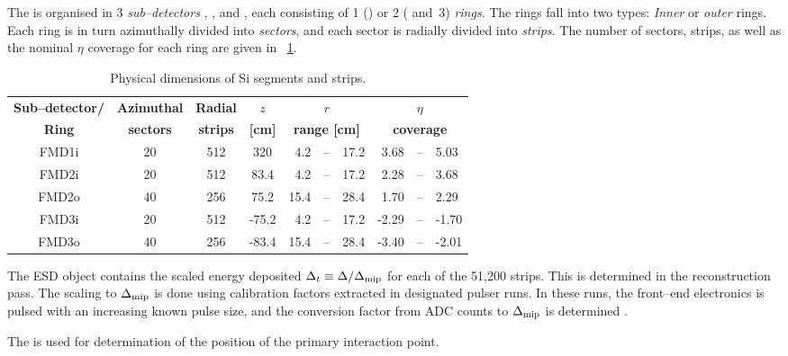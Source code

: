 \documentclass[compat,11pt]{alicenote}
\DeclareRobustCommand{\AlwaysText}[1]{\ifmmode\relax\text{#1}\else #1\fi}
\newcommand*\ESD{\AlwaysText{ESD}}
\newcommand{\DeltaMip}{\ensuremath\Delta_{\text{mip}}}
\newcommand\headColor{\rowcolor{alicered!25!white}}
\newcommand\altRowColor{\rowcolor{aliceyellow!25!white}}
\begin{document}
The \FMD{} is organised in 3 \emph{sub--detectors} , ,
and , each consisting of 1 () or 2 ( and~3)
\emph{rings}.  The rings fall into two types: \emph{Inner} or
\emph{outer} rings.  Each ring is in turn azimuthally divided into
\emph{sectors}, and each sector is radially divided into
\emph{strips}.  The number of sectors, strips, as well as the nominal
$\eta$ coverage for each ring are given in
\tablename~\ref{tab:fmd:overview}.

\begin{table}[htbp]
  \begin{center}
    \caption{Physical dimensions of Si segments and strips.}
    \label{tab:fmd:overview}
    \begin{tabular}{|c|cc|crcl|rcl|}
      \hline
      \headColor%
      \textbf{Sub--detector/} &
      \textbf{Azimuthal}&
      \textbf{Radial} &
      $z$ &
      \multicolumn{3}{c|}{\textbf{$r$}} &
      \multicolumn{3}{c|}{\textbf{$\eta$}} \\ 
      \rowcolor{alicered!25!white}
      \textbf{Ring}&  
      \textbf{sectors} &
      \textbf{strips} & 
      \textbf{[cm]} &
      \multicolumn{3}{c|}{\textbf{range [cm]}} &
      \multicolumn{3}{c|}{\textbf{coverage}} \\
      \hline
      FMD1i & 20& 512& 320  &  4.2&--&17.2& 3.68&--&5.03\\
      \altRowColor{}%
      FMD2i & 20& 512&  83.4&  4.2&--&17.2& 2.28&--&3.68\\
      FMD2o & 40& 256&  75.2& 15.4&--&28.4& 1.70&--&2.29\\
      \altRowColor{}%
      FMD3i & 20& 512& -75.2&  4.2&--&17.2&-2.29&--&-1.70\\
      FMD3o & 40& 256& -83.4& 15.4&--&28.4&-3.40&--&-2.01\\
      \hline
    \end{tabular}
  \end{center}
\end{table}

The \FMD{} \ESD{} object contains the scaled energy deposited
$\Delta_t\equiv\Delta /\DeltaMip$ for each of the 51,200 strips.  This
is determined in the reconstruction pass.  The scaling to $\DeltaMip$
is done using calibration factors extracted in designated pulser runs.
In these runs, the front--end electronics is pulsed with an increasing
known pulse size, and the conversion factor from ADC counts to
$\DeltaMip$ is determined \cite{cholm:2009}.

The \SPD{} is used for determination of the position of the primary
interaction point.
\end{document}
